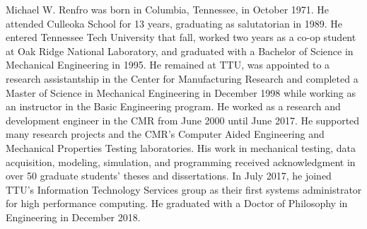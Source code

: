 

Michael W. Renfro was born in Columbia, Tennessee, in October 1971.
He attended Culleoka School for 13 years, graduating as salutatorian in 1989.
He entered Tennessee Tech University that fall, worked two years as a co-op student at Oak Ridge National Laboratory, and graduated with a Bachelor of Science in Mechanical Engineering in 1995.
He remained at TTU, was appointed to a research assistantship in the Center for Manufacturing Research and completed a Master of Science in Mechanical Engineering in December 1998 while working as an instructor in the Basic Engineering program.
He worked as a research and development engineer in the CMR from June 2000 until June 2017.
He supported many research projects and the CMR's Computer Aided Engineering and Mechanical Properties Testing laboratories.
His work in mechanical testing, data acquisition, modeling, simulation, and programming received acknowledgment in over 50 graduate students' theses and dissertations.
In July 2017, he joined TTU's Information Technology Services group as their first systems administrator for high performance computing.
He graduated with a Doctor of Philosophy in Engineering in December 2018.
